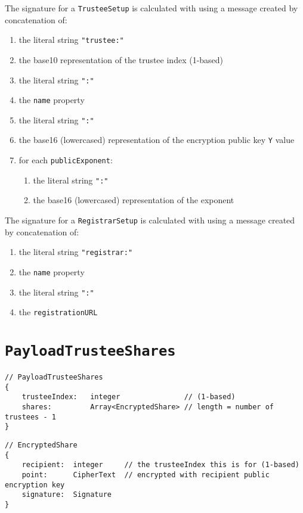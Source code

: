 The signature for a \texttt{TrusteeSetup} is calculated with using a message created by concatenation of:
\begin{enumerate}
    \item the literal string \lstinline[style=ES6]{"trustee:"}
    \item the base10 representation of the trustee index (1-based)
    \item the literal string \lstinline[style=ES6]{":"}
    \item the \texttt{name} property
    \item the literal string \lstinline[style=ES6]{":"}
    \item the base16 (lowercased) representation of the encryption public key \texttt{Y} value
    \item for each \texttt{publicExponent}:
          \begin{enumerate}
              \item the literal string \lstinline[style=ES6]{":"}
              \item the base16 (lowercased) representation of the exponent
          \end{enumerate}
\end{enumerate}

The signature for a \texttt{RegistrarSetup} is calculated with using a message created by concatenation of:

\begin{enumerate}
    \item the literal string \lstinline[style=ES6]{"registrar:"}
    \item the \texttt{name} property
    \item the literal string \lstinline[style=ES6]{":"}
    \item the \texttt{registrationURL}
\end{enumerate}

\newpage %
\section*{\texttt{PayloadTrusteeShares}}
\label{dt:payload:shares}
\begin{lstlisting}[style=ES6]
// PayloadTrusteeShares
{
    trusteeIndex:   integer               // (1-based)
    shares:         Array<EncryptedShare> // length = number of trustees - 1
}
\end{lstlisting}
\vspace*{-0.95em}
\label{dt:encshare}
\begin{lstlisting}[style=ES6, firstnumber=last]
// EncryptedShare
{
    recipient:  integer     // the trusteeIndex this is for (1-based)
    point:      CipherText  // encrypted with recipient public encryption key
    signature:  Signature
}
\end{lstlisting}


